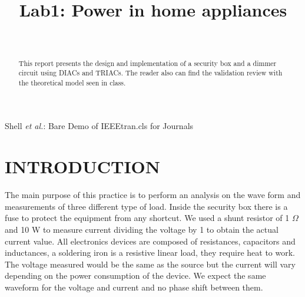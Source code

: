 \documentclass[journal]{IEEEtran}
\begin{document}
\title{\textbf{Lab1: Power in home appliances}}
\author{
  \\
}

%
{Shell \MakeLowercase{\textit{et al.}}: Bare Demo of IEEEtran.cls 
for Journals}
	
\maketitle

\begin{abstract}
This report presents the design and implementation of a security box 
and a dimmer circuit using DIACs and TRIACs. The reader also can find 
the validation review with the theoretical model seen in class.    
\end{abstract}


\begin{IEEEkeywords}  

\end{IEEEkeywords}

\IEEEpeerreviewmaketitle

\section{INTRODUCTION}

The main purpose of this practice is to perform an analysis on the 
wave form and measurements of three different type of load. Inside the 
security box there is a fuse to protect the equipment from any 
shortcut. We used a shunt resistor of 1 $\Omega$ and 10 W to measure 
current dividing the voltage by 1 to obtain the actual current value.
All electronics devices are composed of resistances, capacitors and 
inductances, a soldering iron is a resistive linear load, they require 
heat to work. The voltage measured would be the same as the source but 
the current will vary depending on the power consumption of the 
device. We expect the same waveform for the voltage and current and no 
phase shift between them.\\
\end{document}

